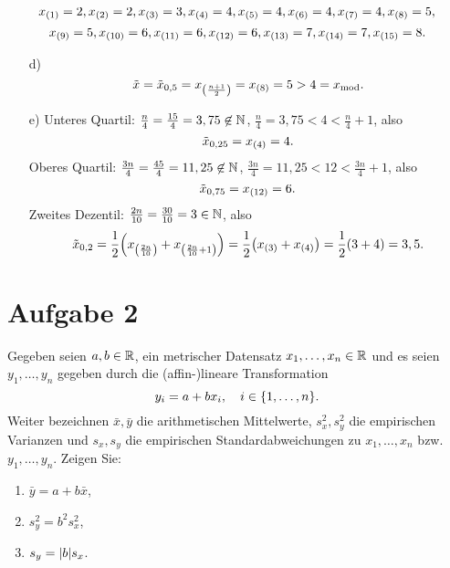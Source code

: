\documentclass{exercise}
\begin{document}
    \[
        x_{\parentheses*{1}} = 2, x_{\parentheses*{2}} = 2, x_{\parentheses*{3}} = 3, x_{\parentheses*{4}} = 4, x_{\parentheses*{5}} = 4, x_{\parentheses*{6}} = 4, x_{\parentheses*{7}} = 4, x_{\parentheses*{8}} = 5,
    \]
    \[
        x_{\parentheses*{9}} = 5, x_{\parentheses*{10}} = 6, x_{\parentheses*{11}} = 6, x_{\parentheses*{12}} = 6, x_{\parentheses*{13}} = 7, x_{\parentheses*{14}} = 7, x_{\parentheses*{15}} = 8.
    \]
    \begin{enumerate}
        \item[d)]
        \[
            \tilde{x} = \tilde{x}_{0,5} = x_{\parentheses*{\frac{n + 1}{2}}} = x_{\parentheses*{8}} = 5 > 4 = x_{\text{mod}}.
        \]
        \item[e)] Unteres Quartil: \(\frac{n}{4} = \frac{15}{4} = 3,75 \not\in \N\), \(\frac{n}{4} = 3,75 < 4 < \frac{n}{4} + 1\), also
        \[
            \tilde{x}_{0,25} = x_{\parentheses*{4}} = 4.
        \]
        Oberes Quartil: \(\frac{3n}{4} = \frac{45}{4} = 11,25 \not\in \N\), \(\frac{3n}{4} = 11,25 < 12 < \frac{3n}{4} + 1\), also
        \[
            \tilde{x}_{0,75} = x_{\parentheses*{12}} = 6.
        \]
        Zweites Dezentil: \(\frac{2n}{10} = \frac{30}{10} = 3 \in \N\), also
        \[
            \tilde{x}_{0,2} = \frac{1}{2}\parentheses*{x_{\parentheses*{\frac{2n}{10}}} + x_{\parentheses*{\frac{2n}{10} + 1}}} = \frac{1}{2}\parentheses*{x_{\parentheses*{3}} + x_{\parentheses*{4}}} = \frac{1}{2}\parentheses*{3 + 4} = 3,5.
        \]
    \end{enumerate}


    \section*{Aufgabe 2}

    \begin{problem}
        Gegeben seien \(a, b \in \R\), ein metrischer Datensatz \(x_1, \ldots, x_n \in \R\) und es seien \(y_1, \ldots, y_n\) gegeben durch die (affin-)lineare Transformation
        \[
            y_i = a + bx_i, \quad i \in \braces*{1, \ldots, n}.
        \]
        Weiter bezeichnen \(\bar{x}, \bar{y}\) die arithmetischen Mittelwerte, \(s_x^2, s_y^2\) die empirischen Varianzen und \(s_x, s_y\) die empirischen Standardabweichungen zu \(x_1, \ldots, x_n\) bzw. \(y_1, \ldots, y_n\).
        Zeigen Sie:
        \begin{enumerate}
            \item \(\bar{y} = a + b\bar{x}\),
            \item \(s_y^2 = b^2 s_x^2\),
            \item \(s_y = \absolute*{b}s_x\). 
        \end{enumerate}
    \end{problem}
\end{document}
